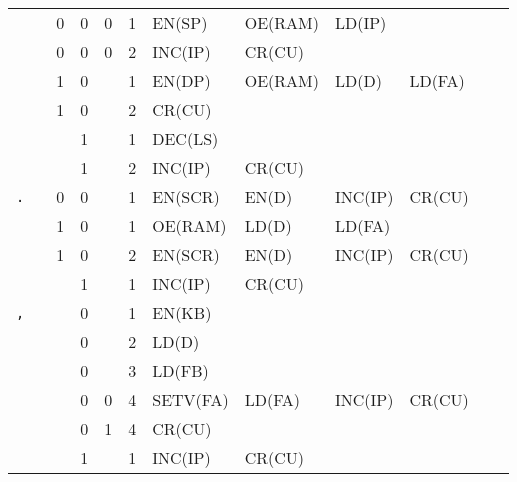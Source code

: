 \begin{longtable}[c] {c|cccc|c|llllll}
    \rowcolor{Gray}               &   & 0 & 0     & 0    & 1     & EN(SP)   & OE(RAM)  & LD(IP)  &        &        &        \\
    \rowcolor{Gray}               &   & 0 & 0     & 0    & 2     & INC(IP)  & CR(CU)   &         &        &        &        \\
    \rowcolor{White}              &   & 1 & 0     &      & 1     & EN(DP)   & OE(RAM)  & LD(D)   & LD(FA) &        &        \\
    \rowcolor{White}              &   & 1 & 0     &      & 2     & CR(CU)   &          &         &        &        &        \\
    \rowcolor{Gray}               &   &   & 1     &      & 1     & DEC(LS)  &          &         &        &        &        \\ 
    \rowcolor{Gray}               &   &   & 1     &      & 2     & INC(IP)  & CR(CU)   &         &        &        &        \\ \hline
    
    \rowcolor{Gray}  \texttt{.}   &   & 0 & 0     &      & 1     & EN(SCR)  & EN(D)    & INC(IP) & CR(CU) &        &        \\
    \rowcolor{White}              &   & 1 & 0     &      & 1     & OE(RAM)  & LD(D)    & LD(FA)  &        &        &        \\
    \rowcolor{White}              &   & 1 & 0     &      & 2     & EN(SCR)  & EN(D)    & INC(IP) & CR(CU) &        &        \\
    \rowcolor{Gray}               &   &   & 1     &      & 1     & INC(IP)  & CR(CU)   &         &        &        &        \\ \hline
    
    \rowcolor{White} \texttt{,}   &   &   & 0     &      & 1     & EN(KB)   &          &         &        &        &        \\
    \rowcolor{White}              &   &   & 0     &      & 2     & LD(D)    &          &         &        &        &        \\
    \rowcolor{White}              &   &   & 0     &      & 3     & LD(FB)   &          &         &        &        &        \\    
    \rowcolor{White}              &   &   & 0     & 0    & 4     & SETV(FA) & LD(FA)   & INC(IP) & CR(CU) &        &        \\
    \rowcolor{Gray}               &   &   & 0     & 1    & 4     & CR(CU)   &          &         &        &        &        \\   
    \rowcolor{White}              &   &   & 1     &      & 1     & INC(IP)  & CR(CU)   &         &        &        &        \\ \hline
    

\end{longtable}
